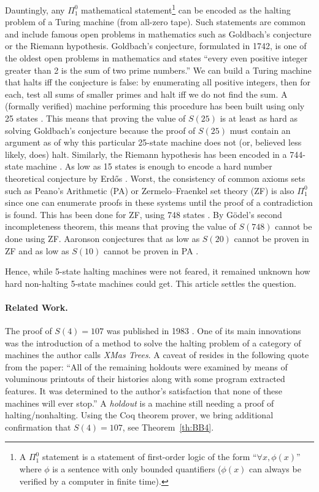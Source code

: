\documentclass[a4paper,british]{article}
\theoremstyle{definition} %
\numberwithin{equation}{section}
\theoremstyle{definition} %
\newcommand{\BBtheFourth}{107}
\begin{document}
Dauntingly, any $\Pi_1^0$ mathematical statement\footnote{A $\Pi_1^0$ statement is a statement of first-order logic of the form ``$\forall x, \phi(x)$'' where $\phi$ is a sentence with only bounded quantifiers (\ie $\phi(x)$ can always be verified by a computer in finite time).} can be encoded as the halting problem of a Turing machine (from all-zero tape). Such statements are common and include famous open problems in mathematics such as Goldbach's conjecture or the Riemann hypothesis. Goldbach's conjecture, formulated in 1742, is one of the oldest open problems in mathematics and states ``every even positive integer greater than 2 is the sum of two prime numbers.'' We can build a Turing machine that halts iff the conjecture is false: by enumerating all positive integers, then for each, test all sums of smaller primes and halt iff we do not find the sum. A (formally verified) machine performing this procedure has been built using only 25 states \cite{GoldbachTM27, GoldbachTM25}. This means that proving the value of $S(25)$ is at least as hard as solving Goldbach's conjecture because the proof of $S(25)$ must contain an argument as of why this particular 25-state machine does not (or, believed less likely, does) halt. Similarly, the Riemann hypothesis has been encoded in a 744-state machine \cite{RiemannTM,Yedidia2016,BusyBeaverFrontier}. As low as 15 states is enough to encode a hard number theoretical conjecture by Erd\H{o}s \cite{BB15}. Worst, the consistency of common axioms sets such as Peano's Arithmetic (PA) or Zermelo–Fraenkel set theory (ZF) is also $\Pi_1^0$ since one can enumerate proofs in these systems until the proof of a contradiction is found. This has been done for ZF, using 748 states \cite{ZFTM,Yedidia2016,BusyBeaverFrontier,BB748Thesis}. By G\"odel's second incompleteness theorem, this means that proving the value of $S(748)$ cannot be done using ZF. Aaronson conjectures that as low as $S(20)$ cannot be proven in ZF and as low as $S(10)$ cannot be proven in PA \cite{BusyBeaverFrontier}.

Hence, while 5-state halting machines were not feared, it remained unknown how hard non-halting 5-state machines could get. This article settles the question.

\paragraph{Related Work.} The proof of $S(4) = \BBtheFourth$ was published in 1983 \cite{Brady83}. One of its main innovations was the introduction of a method to solve the halting problem of a category of machines the author calls \textit{XMas Trees}. A caveat of \cite{Brady83} resides in the following quote from the paper: ``All of the remaining holdouts were examined by means of voluminous printouts of their histories along with some program extracted features. It was determined to the author's satisfaction that none of these machines will ever stop.'' A \textit{holdout} is a machine still needing a proof of halting/nonhalting. Using the Coq theorem prover, we bring additional confirmation that $S(4) = \BBtheFourth$, see Theorem~\ref{th:BB4}.
\end{document}
